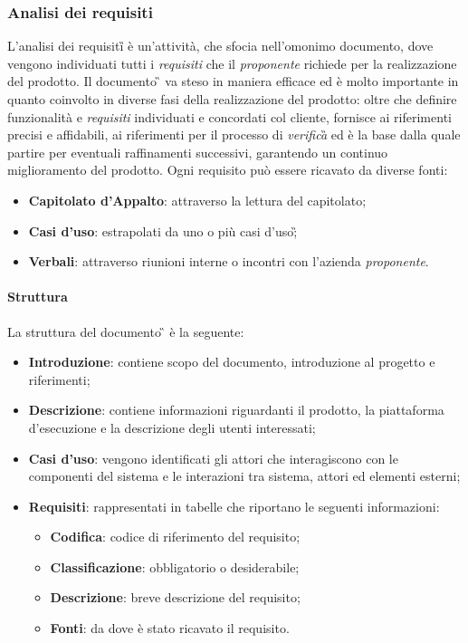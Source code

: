 \subsubsection{Analisi dei requisiti}
L'analisi dei requisiti\G{} è un'attività, che sfocia nell'omonimo documento, dove vengono individuati tutti i \emph{requisiti} che il \emph{proponente} richiede per la realizzazione del prodotto.\newline{}
Il documento \AdR{}\G{} va steso in maniera efficace ed è molto importante in quanto coinvolto in diverse fasi della realizzazione del prodotto: oltre che definire funzionalità e \emph{requisiti} individuati e concordati col cliente, fornisce ai \progrs{} riferimenti precisi e affidabili, ai \verf{} riferimenti per il processo di \emph{verifica}\G{} ed è la base dalla quale partire per eventuali raffinamenti successivi, garantendo un continuo miglioramento del prodotto. 
Ogni requisito può essere ricavato da diverse fonti:
\begin{itemize}
	\item \textbf{Capitolato d'Appalto}: attraverso la lettura del capitolato;
	\item \textbf{Casi d'uso}: estrapolati da uno o più casi d'uso\G; 
	\item \textbf{Verbali}: attraverso riunioni interne o incontri con l'azienda \emph{proponente}.
\end{itemize}

\paragraph{Struttura} \aCapo{}
La struttura del documento \AdR{}\G{} è la seguente:
\begin{itemize}
	\item \textbf{Introduzione}: contiene scopo del documento, introduzione al progetto e riferimenti;
	\item \textbf{Descrizione}: contiene informazioni riguardanti il prodotto, la piattaforma d'esecuzione e la descrizione degli utenti interessati;
	\item \textbf{Casi d'uso}: vengono identificati gli attori che interagiscono con le componenti del sistema e le interazioni tra sistema, attori ed elementi esterni;
	\item \textbf{Requisiti}: rappresentati in tabelle che riportano le seguenti informazioni:
		\begin{itemize}
			\item \textbf{Codifica}: codice di riferimento del requisito;
			\item \textbf{Classificazione}: obbligatorio o desiderabile;
			\item \textbf{Descrizione}: breve descrizione del requisito;
			\item \textbf{Fonti}: da dove è stato ricavato il requisito.
		\end{itemize}
\end{itemize}

